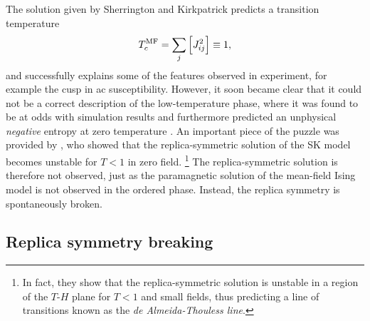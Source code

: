 The solution given by Sherrington and Kirkpatrick predicts a transition
temperature
\begin{equation}
  T_c^{\mathrm{MF}} = \sum_j \left[J_{ij}^2\right] \equiv 1,
\end{equation}
and successfully explains some of the features observed in experiment, for
example the cusp in ac susceptibility. However, it soon became clear that it
could not be a correct description of the low-temperature phase, where it was
found to be at odds with simulation results and furthermore predicted an
unphysical \emph{negative} entropy at zero temperature
\autocite{kirkpatrick1978infinite}. An important piece of the puzzle was
provided by \textcite{dealmeida1978stability}, who showed that the
replica-symmetric solution of the SK model becomes unstable for $T<1$ in zero
field.%
\footnote{
  In fact, they show that the replica-symmetric solution is unstable in a
  region of the $T$-$H$ plane for $T<1$ and small fields, thus predicting
  a line of transitions known as the \emph{de Almeida-Thouless line}.
}
The replica-symmetric solution is therefore not observed, just as the
paramagnetic solution of the mean-field Ising model is not observed in the
ordered phase. Instead, the replica symmetry is spontaneously broken.


\subsection{Replica symmetry breaking}
\label{sec:intro-rsb}

